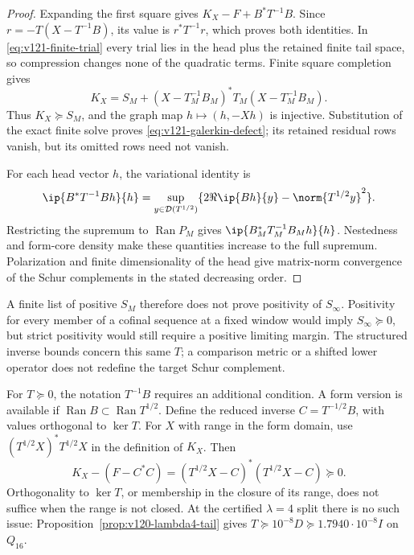 \begin{proof}
Expanding the first square gives $K_X-F+B^*T^{-1}B$.
Since $r=-T(X-T^{-1}B)$, its value is $r^*T^{-1}r$,
which proves both identities. In \eqref{eq:v121-finite-trial}
every trial lies in the head plus the retained finite tail space,
so compression changes none of the quadratic terms. Finite square completion gives
\[
 K_X=S_M+(X-T_M^{-1}B_M)^*T_M(X-T_M^{-1}B_M).
\]
Thus $K_X\succeq S_M$, and the graph map $h\mapsto(h,-Xh)$ is
injective. Substitution of the exact finite solve proves
\eqref{eq:v121-galerkin-defect}; its retained residual rows vanish,
but its omitted rows need not vanish.

For each head vector $h$, the variational identity is
\[
 \ip{B^*T^{-1}Bh}{h}
 =\sup_{y\in\mathcal D(T^{1/2})}
 \{2\Re\ip{Bh}{y}-\norm{T^{1/2}y}^2\}.
\]
Restricting the supremum to $\operatorname{Ran}P_M$ gives
$\ip{B_M^*T_M^{-1}B_Mh}{h}$. Nestedness and form-core density make
these quantities increase to the full supremum. Polarization and
finite dimensionality of the head give matrix-norm convergence of
the Schur complements in the stated decreasing order.
\end{proof}

A finite list of positive $S_M$ therefore does not prove positivity
of $S_\infty$. Positivity for every member of a cofinal sequence at
a fixed window would imply $S_\infty\succeq0$, but strict positivity
would still require a positive limiting margin. The structured inverse
bounds concern this same $T$; a comparison metric or a shifted lower
operator does not redefine the target Schur complement.

\begin{remark}\label{rem:v121-range}
For $T\succeq0$, the notation $T^{-1}B$ requires an additional
condition. A form version is available if
$\operatorname{Ran}B\subset\operatorname{Ran}T^{1/2}$. Define the
reduced inverse $C=T^{-1/2}B$, with values orthogonal to $\ker T$.
For $X$ with range in the form domain, use
$(T^{1/2}X)^*T^{1/2}X$ in the definition of $K_X$. Then
\[
 K_X-(F-C^*C)=(T^{1/2}X-C)^*(T^{1/2}X-C)\succeq0.
\]
Orthogonality to $\ker T$, or membership in the closure of its range,
does not suffice when the range is not closed. At the certified
$\lambda=4$ split there is no such issue:
Proposition~\ref{prop:v120-lambda4-tail} gives
$T\succeq10^{-8}D\succeq1.7940\cdot10^{-8}I$ on $Q_{16}$.
\end{remark}

